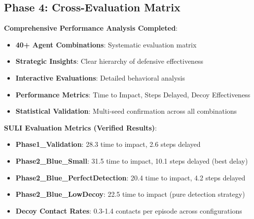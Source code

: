 \documentclass[11pt]{article}
\begin{document}
\begin{intuition}
\subsection{Phase 4: Cross-Evaluation Matrix}
\begin{example}
\textbf{Comprehensive Performance Analysis Completed}:
\begin{itemize}
\item \textbf{40+ Agent Combinations}: Systematic evaluation matrix
\item \textbf{Strategic Insights}: Clear hierarchy of defensive effectiveness
\item \textbf{Interactive Evaluations}: Detailed behavioral analysis
\item \textbf{Performance Metrics}: Time to Impact, Steps Delayed, Decoy Effectiveness
\item \textbf{Statistical Validation}: Multi-seed confirmation across all combinations
\end{itemize}
\end{example}

\begin{mathdetails}
\textbf{SULI Evaluation Metrics (Verified Results)}:
\begin{itemize}
\item \textbf{Phase1\_Validation}: 28.3 time to impact, 2.6 steps delayed
\item \textbf{Phase2\_Blue\_Small}: 31.5 time to impact, 10.1 steps delayed (best delay)
\item \textbf{Phase2\_Blue\_PerfectDetection}: 20.4 time to impact, 4.2 steps delayed
\item \textbf{Phase2\_Blue\_LowDecoy}: 22.5 time to impact (pure detection strategy)
\item \textbf{Decoy Contact Rates}: 0.3-1.4 contacts per episode across configurations
\end{itemize}
\end{mathdetails}



\end{intuition}
\end{document}
